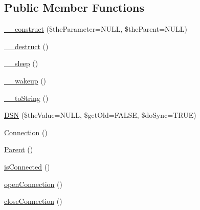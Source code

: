 \subsection*{Public Member Functions}
\begin{DoxyCompactItemize}
\item 
\hyperlink{class_ontology_wrapper_1_1_connection_object_a42c5c7a5376f3e795b6dcd2cec53c429}{\-\_\-\-\_\-construct} (\$the\-Parameter=N\-U\-L\-L, \$the\-Parent=N\-U\-L\-L)
\item 
\hyperlink{class_ontology_wrapper_1_1_connection_object_a129e5d78f1d2e4b1d0e866a604d6e34c}{\-\_\-\-\_\-destruct} ()
\item 
\hyperlink{class_ontology_wrapper_1_1_connection_object_a667dca54383faee6ee734ba2109c0b52}{\-\_\-\-\_\-sleep} ()
\item 
\hyperlink{class_ontology_wrapper_1_1_connection_object_a18db4f7ebb47a4c51b4b3483314c14a9}{\-\_\-\-\_\-wakeup} ()
\item 
\hyperlink{class_ontology_wrapper_1_1_connection_object_ad7fbc642081f429ca17ffef94880d865}{\-\_\-\-\_\-to\-String} ()
\item 
\hyperlink{class_ontology_wrapper_1_1_connection_object_a9a013bdb9589e847926d196de62e87e3}{D\-S\-N} (\$the\-Value=N\-U\-L\-L, \$get\-Old=F\-A\-L\-S\-E, \$do\-Sync=T\-R\-U\-E)
\item 
\hyperlink{class_ontology_wrapper_1_1_connection_object_aeffe3ba284ae71caacaab38b3c80d345}{Connection} ()
\item 
\hyperlink{class_ontology_wrapper_1_1_connection_object_aebe90e0304d983af0f695b706120e62c}{Parent} ()
\item 
\hyperlink{class_ontology_wrapper_1_1_connection_object_abfd8e3b96ce288b2d1b1e586e8e7172a}{is\-Connected} ()
\item 
\hyperlink{class_ontology_wrapper_1_1_connection_object_aa65904a3e38f1b04cdea1d88dd80793b}{open\-Connection} ()
\item 
\hyperlink{class_ontology_wrapper_1_1_connection_object_abfff262a446ab3dc404e4132ee195430}{close\-Connection} ()
\end{DoxyCompactItemize}
